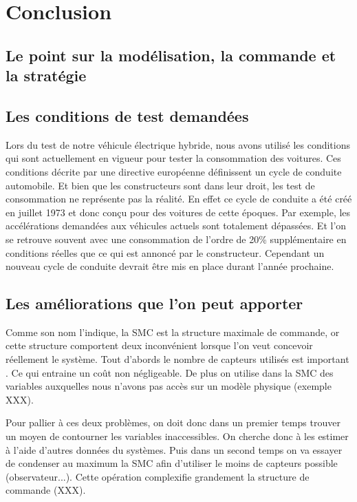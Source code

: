 \section{Conclusion}

\subsection{Le point sur la modélisation, la commande et la stratégie}


\subsection{Les conditions de test demandées}

Lors du test de notre véhicule électrique hybride, nous avons utilisé les conditions qui sont actuellement en vigueur pour tester la consommation des voitures. Ces conditions décrite par une directive européenne définissent un cycle de conduite automobile. Et bien que les constructeurs sont dans leur droit, les test de consommation ne représente pas la réalité. En effet ce cycle de conduite a été créé en juillet 1973 et donc conçu pour des voitures de cette époques. Par exemple, les accélérations demandées aux véhicules actuels sont totalement dépassées. Et l'on se retrouve souvent avec une consommation de l'ordre de 20\% supplémentaire en conditions réelles que ce qui est annoncé par le constructeur. Cependant un nouveau cycle de conduite devrait être mis en place durant l'année prochaine. 


\subsection{Les améliorations que l'on peut apporter}

Comme son nom l'indique, la SMC est la structure maximale de commande, or cette structure comportent deux inconvénient lorsque l'on veut concevoir réellement le système. Tout d'abords le nombre de capteurs utilisés est important . Ce qui entraine un coût non négligeable. De plus on utilise dans la SMC des variables auxquelles nous n'avons pas accès sur un modèle physique (exemple XXX). 

Pour pallier à ces deux problèmes, on doit donc dans un premier temps trouver un moyen de contourner les variables inaccessibles. On cherche donc à les estimer à l'aide d'autres données du systèmes. Puis dans un second temps on va essayer de condenser au maximum la SMC afin d'utiliser le moins de capteurs possible (observateur...). Cette opération complexifie grandement la structure de commande (XXX). 





